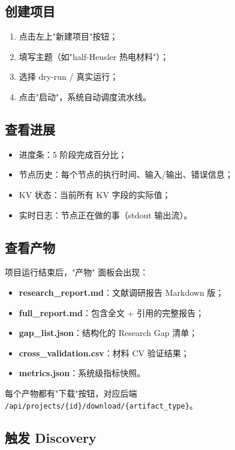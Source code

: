 \documentclass[11pt,a4paper]{article}
\begin{document}
\subsection{创建项目}

\begin{enumerate}[leftmargin=2em]
\item 点击左上"新建项目"按钮；
\item 填写主题（如"half-Heusler 热电材料"）；
\item 选择 dry-run / 真实运行；
\item 点击"启动"，系统自动调度流水线。
\end{enumerate}

\subsection{查看进展}

\begin{itemize}[leftmargin=2em]
\item 进度条：5 阶段完成百分比；
\item 节点历史：每个节点的执行时间、输入/输出、错误信息；
\item KV 状态：当前所有 KV 字段的实际值；
\item 实时日志：节点正在做的事（stdout 输出流）。
\end{itemize}

\subsection{查看产物}

项目运行结束后，"产物" 面板会出现：
\begin{itemize}[leftmargin=2em]
\item \textbf{research\_report.md}：文献调研报告 Markdown 版；
\item \textbf{full\_report.md}：包含全文 + 引用的完整报告；
\item \textbf{gap\_list.json}：结构化的 Research Gap 清单；
\item \textbf{cross\_validation.csv}：材料 CV 验证结果；
\item \textbf{metrics.json}：系统级指标快照。
\end{itemize}

每个产物都有"下载"按钮，对应后端 \texttt{/api/projects/\{id\}/download/\{artifact\_type\}}。

\subsection{触发 Discovery}
\end{document}
